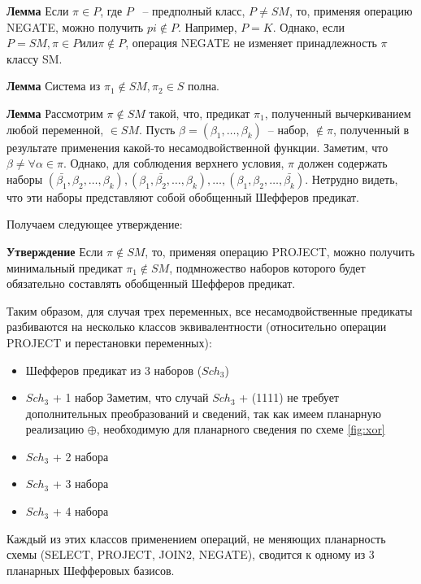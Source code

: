 \documentclass[12pt]{article}
\begin{document}

\textbf{Лемма} Если $\pi \in P$, где $P$ ~-- предполный класс, $P \neq SM$, то, применяя операцию NEGATE,
можно получить $pi \notin P$. Например, $P = K$.
Однако, если $P = SM, \pi \in P или \pi \notin P$, операция NEGATE не изменяет принадлежность $\pi$ классу SM.

\textbf{Лемма} Система из $\pi_1 \notin SM, \pi_2 \in S$ полна.

\label{lemma_sm}
\textbf{Лемма} Рассмотрим $\pi \notin SM$ такой, что, предикат $\pi_1$, полученный вычеркиванием любой переменной, $\in SM$.
Пусть $\beta = (\beta_1, \dots, \beta_k)$~-- набор, $\notin \pi$, полученный в результате применения какой-то несамодвойственной функции.
Заметим, что $\beta \neq \forall \alpha \in \pi$. Однако, для соблюдения верхнего условия, $\pi$ должен содержать наборы 
$(\bar{\beta_1}, \beta_2, \dots, \beta_k), (\beta_1, \bar{\beta_2}, \dots, \beta_k), \dots, (\beta_1, \beta_2, \dots, \bar{\beta_k})$.
Нетрудно видеть, что эти наборы представляют собой обобщенный Шефферов предикат. 

Получаем следующее утверждение: 

\textbf{Утверждение} Если $\pi \notin SM$, то, применяя операцию PROJECT, можно получить минимальный предикат $\pi_1 \notin SM$, 
подмножество наборов которого будет обязательно составлять обобщенный Шефферов предикат.

Таким образом, для случая трех переменных, все несамодвойственные предикаты разбиваются на несколько классов эквивалентности 
(относительно операции PROJECT и перестановки переменных): 
\begin{itemize}
\item{Шефферов предикат из 3 наборов ($Sch_3$)}
\item{$Sch_3$ + 1 набор}
Заметим, что случай $Sch_3$ + (1111) не требует дополнительных преобразований и сведений, так как имеем планарную реализацию
$\oplus$, необходимую для планарного сведения по схеме \ref{fig:xor}
\item{$Sch_3$ + 2 набора}
\item{$Sch_3$ + 3 набора}
\item{$Sch_3$ + 4 набора}
\end{itemize}

Каждый из этих классов применением операций, не меняющих планарность схемы (SELECT, PROJECT, JOIN2, NEGATE), сводится к одному из 3
планарных Шефферовых базисов.
\end{document}
